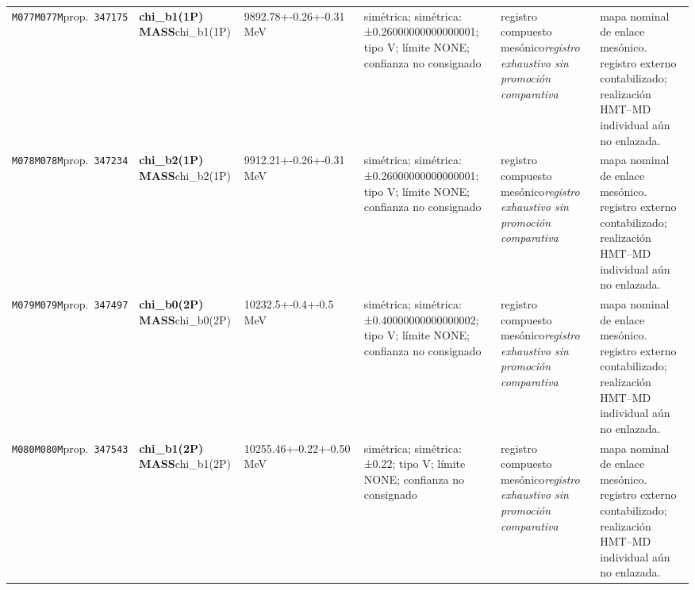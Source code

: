\begin{landscape}
\begin{longtable}{L{1.85cm}L{4.45cm}L{2.35cm}L{4.05cm}L{3.35cm}L{7.15cm}}
\texttt{M077}\newline \texttt{M077M}\newline prop.\ \texttt{347175} & \textbf{chi\_\allowbreak{}b1(1P) MASS}\newline chi\_\allowbreak{}b1(1P) & 9892.78+-0.26+-0.31\,MeV & simétrica; simétrica: ±0.26000000000000001; tipo V; límite NONE; confianza no consignado & registro compuesto mesónico\newline \emph{registro exhaustivo sin promoción comparativa} & mapa nominal de enlace mesónico. registro externo contabilizado; realización HMT--MD individual aún no enlazada. \\
\texttt{M078}\newline \texttt{M078M}\newline prop.\ \texttt{347234} & \textbf{chi\_\allowbreak{}b2(1P) MASS}\newline chi\_\allowbreak{}b2(1P) & 9912.21+-0.26+-0.31\,MeV & simétrica; simétrica: ±0.26000000000000001; tipo V; límite NONE; confianza no consignado & registro compuesto mesónico\newline \emph{registro exhaustivo sin promoción comparativa} & mapa nominal de enlace mesónico. registro externo contabilizado; realización HMT--MD individual aún no enlazada. \\
\texttt{M079}\newline \texttt{M079M}\newline prop.\ \texttt{347497} & \textbf{chi\_\allowbreak{}b0(2P) MASS}\newline chi\_\allowbreak{}b0(2P) & 10232.5+-0.4+-0.5\,MeV & simétrica; simétrica: ±0.40000000000000002; tipo V; límite NONE; confianza no consignado & registro compuesto mesónico\newline \emph{registro exhaustivo sin promoción comparativa} & mapa nominal de enlace mesónico. registro externo contabilizado; realización HMT--MD individual aún no enlazada. \\
\texttt{M080}\newline \texttt{M080M}\newline prop.\ \texttt{347543} & \textbf{chi\_\allowbreak{}b1(2P) MASS}\newline chi\_\allowbreak{}b1(2P) & 10255.46+-0.22+-0.50\,MeV & simétrica; simétrica: ±0.22; tipo V; límite NONE; confianza no consignado & registro compuesto mesónico\newline \emph{registro exhaustivo sin promoción comparativa} & mapa nominal de enlace mesónico. registro externo contabilizado; realización HMT--MD individual aún no enlazada. \\

\end{longtable}
\end{landscape}
